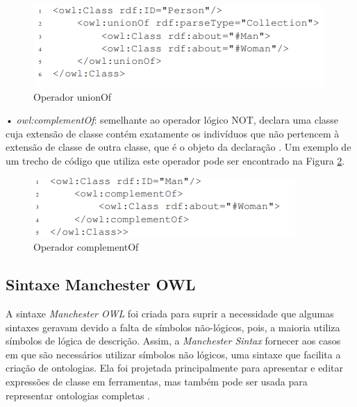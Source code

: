 \documentclass{bcc}
\begin{document}
\begin{figure}[H]
\centering
\includegraphics[width=.9\textwidth]{Figuras/op_or.PNG}
\caption{Operador unionOf}
\label{fig:opor}
\end{figure}


• \textit{owl:complementOf}: semelhante ao operador lógico NOT,  declara uma classe cuja extensão de classe contém exatamente os indivíduos que não pertencem à extensão de classe de outra classe, que é o objeto da declaração \cite{bechhofer2004}. Um exemplo de um trecho de código que utiliza este operador pode ser encontrado na Figura \ref{fig:opnot}.

\begin{figure}[H]
\centering
\includegraphics[width=.9\textwidth]{Figuras/op_not.PNG}
\caption{Operador complementOf}
\label{fig:opnot}
\end{figure}


\subsection{Sintaxe Manchester OWL}

A sintaxe \textit{Manchester OWL} \cite{horridge2006} foi criada para suprir a necessidade que algumas sintaxes geravam devido a falta de símbolos não-lógicos, pois, a maioria utiliza símbolos de lógica de descrição. Assim, a \textit{Manchester Sintax} fornecer aos casos em que são necessários utilizar símbolos não lógicos, uma sintaxe que facilita a criação de ontologias. Ela foi projetada principalmente para apresentar e editar expressões de classe em ferramentas, mas também pode ser usada para representar ontologias completas \cite{horridge2006}.
\end{document}
